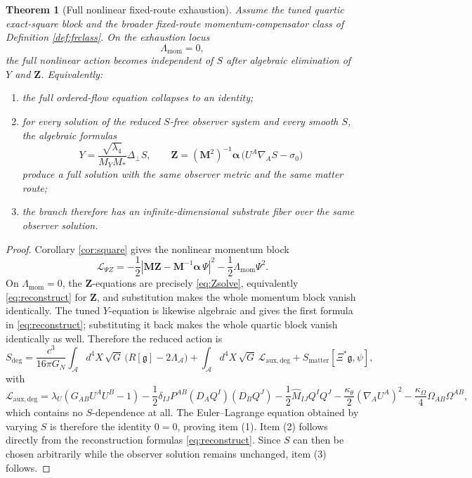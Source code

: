 \documentclass[11pt]{article}
\newcommand{\Sub}{\mathcal{A}}
\newcommand{\BridgeMetric}{\mathfrak{g}}
\newtheorem{theorem}{Theorem}
\begin{document}
\begin{theorem}[Full nonlinear fixed-route exhaustion]
\label{thm:exhaustion}
Assume the tuned quartic exact-square block and the broader fixed-route momentum-compensator class of Definition \ref{def:frclass}. On the exhaustion locus
\begin{equation}
\Lambda_{\mathrm{mom}}=0,
\label{eq:exhaustion}
\end{equation}
the full nonlinear action becomes independent of \(S\) after algebraic elimination of \(Y\) and \(\bm Z\). Equivalently:
\begin{enumerate}
    \item the full ordered-flow equation collapses to an identity;
    \item for every solution of the reduced \(S\)-free observer system and every smooth \(S\), the algebraic formulas
    \begin{equation}
    Y=\frac{\sqrt{\lambda_4}}{M_YM_*}\Delta_\perp S,
    \qquad
    \bm Z=(\mathbf M^2)^{-1}\bm\alpha\,
    \bigl(U^A\nabla_A S-\sigma_0\bigr)
    \label{eq:reconstruct}
    \end{equation}
    produce a full solution with the same observer metric and the same matter route;
    \item the branch therefore has an infinite-dimensional substrate fiber over the same observer solution.
\end{enumerate}
\end{theorem}

\begin{proof}
Corollary \ref{cor:square} gives the nonlinear momentum block
\[
\mathcal L_{\Psi Z}
=
-\frac12
\left|
\mathbf M\bm Z-\mathbf M^{-1}\bm\alpha\,\Psi
\right|^2
-\frac12\Lambda_{\mathrm{mom}}\Psi^2.
\]
On \(\Lambda_{\mathrm{mom}}=0\), the \(\bm Z\)-equations are precisely \eqref{eq:Zsolve}, equivalently \eqref{eq:reconstruct} for \(\bm Z\), and substitution makes the whole momentum block vanish identically. The tuned \(Y\)-equation is likewise algebraic and gives the first formula in \eqref{eq:reconstruct}; substituting it back makes the whole quartic block vanish identically as well. Therefore the reduced action is
\begin{equation}
S_{\mathrm{deg}}
=
\frac{c^3}{16\pi G_N}
\int_{\Sub} d^4X\,\sqrt{G}\,\bigl(R[\BridgeMetric]-2\Lambda_{\Sub}\bigr)
+\int_{\Sub} d^4X\,\sqrt{G}\,\mathcal L_{\mathrm{aux,deg}}
+S_{\mathrm{matter}}[\Xi^*\BridgeMetric,\psi],
\label{eq:Sdeg}
\end{equation}
with
\begin{equation}
\mathcal L_{\mathrm{aux,deg}}
=
\lambda_U(G_{AB}U^AU^B-1)
-\frac12\delta_{IJ}P^{AB}(D_AQ^I)(D_BQ^J)
-\frac12\widehat M_{IJ}Q^IQ^J
-\frac{\kappa_\theta}{2}(\nabla_AU^A)^2
-\frac{\kappa_\Omega}{4}\Omega_{AB}\Omega^{AB},
\label{eq:Ldeg}
\end{equation}
which contains no \(S\)-dependence at all. The Euler--Lagrange equation obtained by varying \(S\) is therefore the identity \(0=0\), proving item (1). Item (2) follows directly from the reconstruction formulas \eqref{eq:reconstruct}. Since \(S\) can then be chosen arbitrarily while the observer solution remains unchanged, item (3) follows.
\end{proof}
\end{document}
